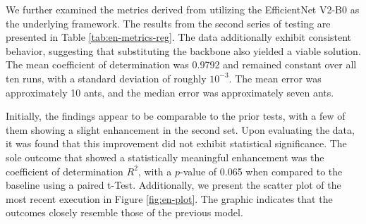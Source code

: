 We further examined the metrics derived from utilizing the EfficientNet V2-B0 as the underlying framework. The results from the second series of testing are presented in Table \ref{tab:en-metrics-reg}. The data additionally exhibit consistent behavior, suggesting that substituting the backbone also yielded a viable solution. The mean coefficient of determination was 0.9792 and remained constant over all ten runs, with a standard deviation of roughly $10^{-3}$. The mean error was approximately 10 ants, and the median error was approximately seven ants. 

Initially, the findings appear to be comparable to the prior tests, with a few of them showing a slight enhancement in the second set. Upon evaluating the data, it was found that this improvement did not exhibit statistical significance. The sole outcome that showed a statistically meaningful enhancement was the coefficient of determination $R^2$, with a $p$-value of 0.065 when compared to the baseline using a paired t-Test. Additionally, we present the scatter plot of the most recent execution in Figure \ref{fig:en-plot}. The graphic indicates that the outcomes closely resemble those of the previous model.

\begin{table}[h!]
\centering
\caption{Counting metrics for the EfficientNet V2-B0}
\label{tab:en-metrics-reg}
\end{table}

